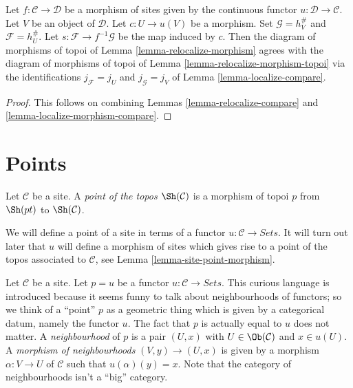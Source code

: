 \begin{lemma}
\label{lemma-relocalize-morphism-compare}
Let $f : \mathcal{C} \to \mathcal{D}$ be a morphism of sites given
by the continuous functor $u : \mathcal{D} \to \mathcal{C}$.
Let $V$ be an object of $\mathcal{D}$. Let $c : U \to u(V)$ be a morphism.
Set $\mathcal{G} = h_V^\#$ and $\mathcal{F} = h_U^\#$.
Let $s : \mathcal{F} \to f^{-1}\mathcal{G}$ be the map induced by $c$.
Then the diagram of morphisms of topoi of
Lemma \ref{lemma-relocalize-morphism}
agrees with the diagram of morphisms of topoi of
Lemma \ref{lemma-relocalize-morphism-topoi}
via the identifications $j_\mathcal{F} = j_U$
and $j_\mathcal{G} = j_V$ of
Lemma \ref{lemma-localize-compare}.
\end{lemma}

\begin{proof}
This follows on combining
Lemmas \ref{lemma-relocalize-compare} and
\ref{lemma-localize-morphism-compare}.
\end{proof}


















\section{Points}
\label{section-points}

\begin{definition}
\label{definition-point-topos}
Let $\mathcal{C}$ be a site.
A {\it point of the topos $\Sh(\mathcal{C})$}
is a morphism of topoi $p$ from $\Sh(pt)$ to
$\Sh(\mathcal{C})$.
\end{definition}

\noindent
We will define a point of a site in terms of a functor
$u : \mathcal{C} \to \textit{Sets}$.
It will turn out later that $u$ will define a morphism of sites
which gives rise to a point of the topos associated to $\mathcal{C}$, see
Lemma \ref{lemma-site-point-morphism}.

\medskip\noindent
Let $\mathcal{C}$ be a site. Let $p = u$ be
a functor $u : \mathcal{C} \to \textit{Sets}$.
This curious language is introduced because it
seems funny to talk about neighbourhoods of functors;
so we think of a ``point'' $p$ as a geometric thing which
is given by a categorical datum, namely the functor $u$.
The fact that $p$ is actually equal to $u$ does not matter.
A {\it neighbourhood} of $p$ is a pair $(U, x)$ with
$U \in \Ob(\mathcal{C})$ and $x \in u(U)$.
A {\it morphism of neighbourhoods} $(V, y) \to (U, x)$
is given by a morphism $\alpha :V \to U$ of $\mathcal{C}$
such that $u(\alpha)(y) = x$. Note that the category of
neighbourhoods isn't a ``big'' category.

